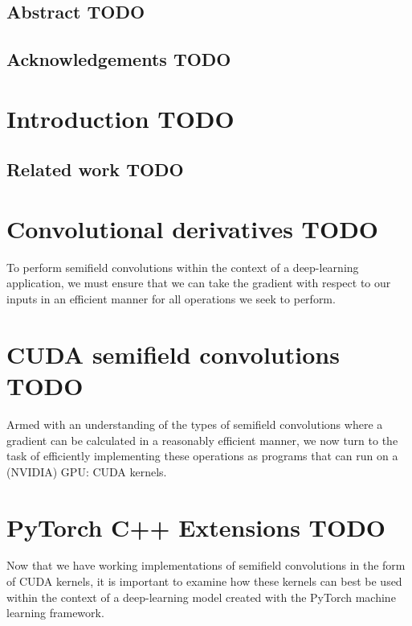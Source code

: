 \documentclass[a4paper, 12pt]{report}
\def\comment#1{\color{red}#1\color{black}}
\begin{document}
\newpage



\setcounter{page}{1}
\pagestyle{plain} 


\section*{Abstract \comment{TODO}}


\section*{Acknowledgements \comment{TODO}}

\tableofcontents


\chapter{Introduction \comment{TODO}}


\newpage
\section{Related work \comment{TODO}}


\chapter{Convolutional derivatives \comment{TODO}}
To perform semifield convolutions within the context of a deep-learning application, we must ensure that we can take the gradient with respect to our inputs in an efficient manner for all operations we seek to perform.

\chapter{CUDA semifield convolutions \comment{TODO}}
Armed with an understanding of the types of semifield convolutions where a gradient can be calculated in a reasonably efficient manner, we now turn to the task of efficiently implementing these operations as programs that can run on a (NVIDIA) GPU: CUDA kernels.

\chapter{PyTorch C++ Extensions \comment{TODO}}
Now that we have working implementations of semifield convolutions in the form of CUDA kernels, it is important to examine how these kernels can best be used within the context of a deep-learning model created with the PyTorch machine learning framework.
\end{document}
